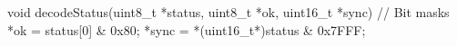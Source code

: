 void decodeStatus(uint8_t *status, uint8_t *ok, uint16_t *sync) {
	                           // Bit masks
	*ok   = status[0]          & 0x80;
	*sync = *(uint16_t*)status & 0x7FFF;
}